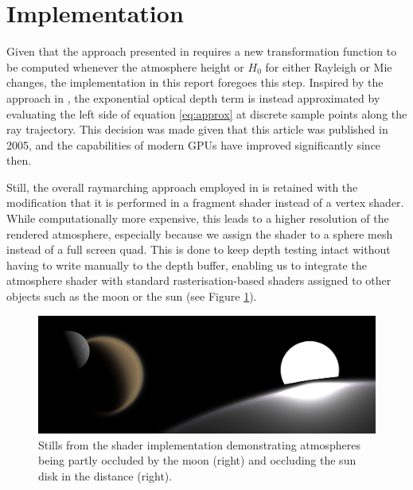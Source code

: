 \documentclass[12pt]{article}
\begin{document}
\section{Implementation}
Given that the approach presented in \cite{oneil_chapter_nodate} requires a new transformation function to be computed whenever the atmosphere height or $H_0$ for either Rayleigh or Mie changes, the implementation in this report foregoes this step.
Inspired by the approach in \cite{gltracy_shadertoy_nodate}, the exponential optical depth term is instead approximated by evaluating the left side of equation \eqref{eq:approx} at discrete sample points along the ray trajectory.
This decision was made given that this article was published in 2005, and the capabilities of modern GPUs have improved significantly since then.

Still, the overall raymarching approach employed in \cite{oneil_chapter_nodate} is retained with the modification that it is performed in a fragment shader instead of a vertex shader.
While computationally more expensive, this leads to a higher resolution of the rendered atmosphere, especially because we assign the shader to a sphere mesh instead of a full screen quad.
This is done to keep depth testing intact without having to write manually to the depth buffer, enabling us to integrate the atmosphere shader with standard rasterisation-based shaders assigned to other objects such as the moon or the sun (see Figure \ref{fig:occlusion}).
\begin{figure}[h!]
    \centering
    \includegraphics[width=1.0\textwidth]{./figures/occlusion.jpg}
    \caption{Stills from the shader implementation demonstrating atmospheres being partly occluded by the moon (right) and occluding the sun disk in the distance (right).}
    \label{fig:occlusion}
\end{figure}
\end{document}
